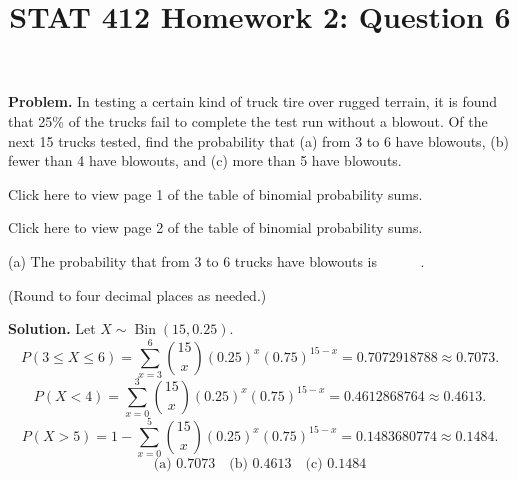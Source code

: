 \documentclass[11pt]{article}
\title{STAT 412 Homework 2: Question 6}
\author{}
\date{}
\begin{document}
\maketitle
\textbf{Problem.} In testing a certain kind of truck tire over rugged terrain,
it is found that 25\% of the trucks fail to complete the test run without a
blowout. Of the next 15 trucks tested, find the probability that (a) from 3 to
6 have blowouts, (b) fewer than 4 have blowouts, and (c) more than 5 have
blowouts.

Click here to view page 1 of the table of binomial probability sums.

Click here to view page 2 of the table of binomial probability sums.

(a) The probability that from 3 to 6 trucks have blowouts is
\(\boxed{\phantom{0.0000}}\).

(Round to four decimal places as needed.)

\textbf{Solution.} Let \(X\sim\operatorname{Bin}(15,0.25)\).
\[
P(3\le X\le6)=\sum_{x=3}^{6}\binom{15}{x}(0.25)^x(0.75)^{15-x}
=0.7072918788\approx0.7073.
\]
\[
P(X<4)=\sum_{x=0}^{3}\binom{15}{x}(0.25)^x(0.75)^{15-x}
=0.4612868764\approx0.4613.
\]
\[
P(X>5)=1-\sum_{x=0}^{5}\binom{15}{x}(0.25)^x(0.75)^{15-x}
=0.1483680774\approx0.1484.
\]
\[
\boxed{\text{(a) }0.7073\quad\text{(b) }0.4613\quad\text{(c) }0.1484}
\]
\end{document}
